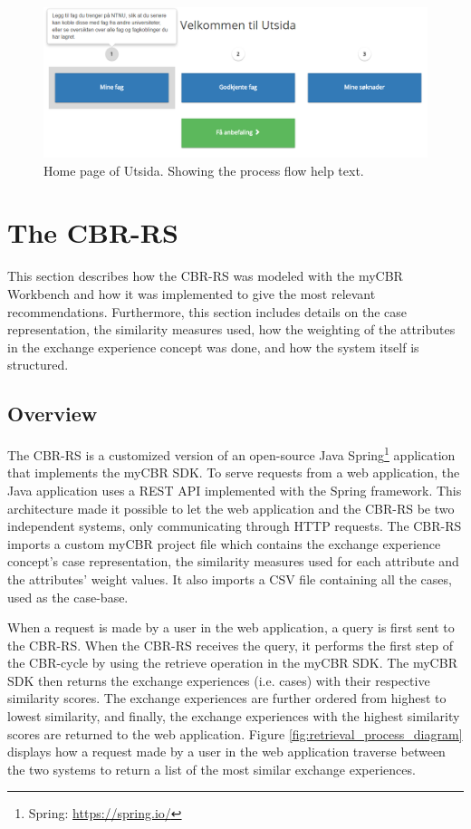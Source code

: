 \begin{figure}[h]
    \centering
    \includegraphics[width=1\textwidth]{fig/utsida_screenshots/steps.png}
    \caption[Home page of Utsida]{Home page of Utsida. Showing the process flow help text.}
    \label{fig:utsida_index}
\end{figure}

\section{The CBR-RS}

This section describes how the CBR-RS was modeled with the myCBR Workbench and how it was implemented to give the most relevant recommendations. Furthermore, this section includes details on the case representation, the similarity measures used, how the weighting of the attributes in the exchange experience concept was done, and how the system itself is structured.

\subsection{Overview}

The CBR-RS is a customized version of an open-source Java Spring\footnote{Spring: \url{https://spring.io/}} application that implements the myCBR SDK. To serve requests from a web application, the Java application uses a REST API implemented with the Spring framework. This architecture made it possible to let the web application and the CBR-RS be two independent systems, only communicating through HTTP requests. The CBR-RS imports a custom myCBR project file which contains the exchange experience concept's case representation, the similarity measures used for each attribute and the attributes' weight values. It also imports a CSV file containing all the cases, used as the case-base.

When a request is made by a user in the web application, a query is first sent to the CBR-RS. When the CBR-RS receives the query, it performs the first step of the CBR-cycle by using the retrieve operation in the myCBR SDK. The myCBR SDK then returns the exchange experiences (i.e. cases) with their respective similarity scores. The exchange experiences are further ordered from highest to lowest similarity, and finally, the exchange experiences with the highest similarity scores are returned to the web application. Figure \ref{fig:retrieval_process_diagram} displays how a request made by a user in the web application traverse between the two systems to return a list of the most similar exchange experiences.

